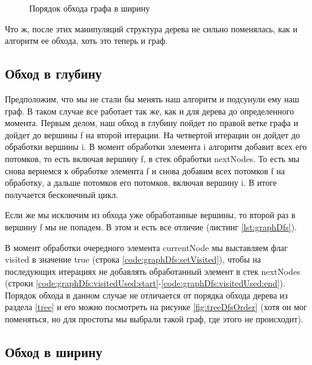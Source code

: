 \documentclass[../../article.tex]{subfiles}
\begin{document}
\begin{figure}
    \caption{Порядок обхода графа в ширину}
    \label{fig:graphBfsOrder}
\end{figure}

Что ж, после этих манипуляций структура дерева не сильно поменялась, как и алгоритм ее обхода, хоть это теперь и граф.

\subsection{Обход в глубину}

Предположим, что мы не стали бы менять наш алгоритм и подсунули ему наш граф. В таком случае все работает так же, как и для дерева до определенного момента. Первым делом, наш обход в глубину пойдет по правой ветке графа и дойдет до вершины {\firacodebold f} на второй итерации. На четвертой итерации он дойдет до обработки вершины {\firacodebold i}. В момент обработки элемента {\firacodebold i} алгоритм добавит всех его потомков, то есть включая вершину {\firacodebold f}, в стек обработки {\firacodebold nextNodes}. То есть мы снова вернемся к обработке элемента {\firacodebold f} и снова добавим всех потомков {\firacodebold f} на обработку, а дальше потомков его потомков, включая вершину {\firacodebold i}. В итоге получается бесконечный цикл.

Если же мы исключим из обхода уже обработанные вершины, то второй раз в вершину {\firacodebold f} мы не попадем. В этом и есть все отличие (листинг \ref{lst:graphDfs}).

В момент обработки очередного элемента {\firacodebold currentNode} мы выставляем флаг {\firacodebold visited} в значение {\firacodebold true} (строка \ref{code:graphDfs:setVisited}), чтобы на последующих итерациях не добавлять обработанный элемент в стек {\firacodebold nextNodes} (строки \ref{code:graphDfs:visitedUsed:start}-\ref{code:graphDfs:visitedUsed:end}). Порядок обхода в данном случае не отличается от порядка обхода дерева из раздела \ref{tree} и его можно посмотреть на рисунке \ref{fig:treeDfsOrder} (хотя он мог поменяться, но для простоты мы выбрали такой граф, где этого не происходит).

\subsection{Обход в ширину}
\end{document}
